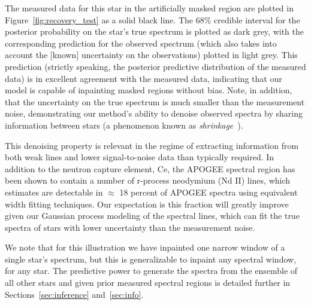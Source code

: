 \documentclass[a4paper,fleqn,usenatbib]{mnras}
\begin{document}
The measured data for this star in the artificially masked region are plotted in Figure~\ref{fig:recovery_test} as a solid black line. The 68\% credible interval for the posterior probability on the star's true spectrum is plotted as dark grey, with the corresponding prediction for the observed spectrum (which also takes into account the [known] uncertainty on the observations) plotted in light grey. This prediction (strictly speaking, the posterior predictive distribution of the measured data) is in excellent agreement with the measured data, indicating that our model is capable of inpainting masked regions without bias. Note, in addition, that the uncertainty on the true spectrum is much smaller than the measurement noise, demonstrating our method's ability to denoise observed spectra by sharing information between stars (a phenomenon known as {\it shrinkage}~\citep[see, e.g.,][Chapter 13]{Busemeyer_etal:2015}).

This denoising property is relevant in the regime of extracting information from both weak lines and lower signal-to-noise data than typically required. In addition to the neutron capture element, Ce, the APOGEE spectral region has been shown to contain a number of r-process neodymium (Nd II) lines, which~\citet{Hasselquist_etal:2016} estimates are detectable in $\approx$ 18 percent of APOGEE spectra using equivalent width fitting techniques. Our expectation is this fraction will greatly improve given our Gaussian process modeling of the spectral lines, which can fit the true spectra of stars with lower uncertainty than the measurement noise.


We note that for this illustration we have inpainted one narrow window of a single star's spectrum, but this is generalizable to inpaint any spectral window, for any star. The predictive power to generate the spectra from the ensemble of all other stars and given prior measured spectral regions is detailed further in Sections~\ref{sec:inference} and~\ref{sec:info}. 
\end{document}
